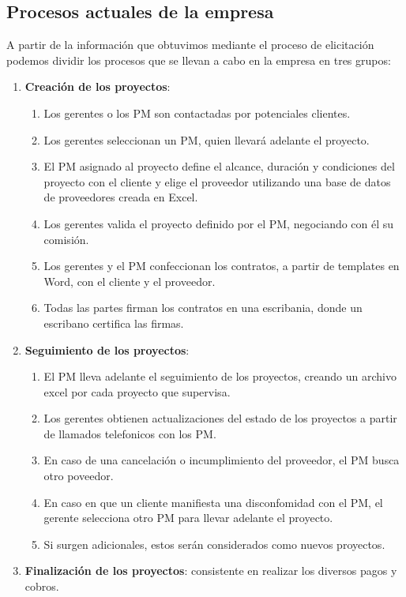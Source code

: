 \subsection{Procesos actuales de la empresa}

A partir de la información que obtuvimos mediante el proceso de elicitación podemos dividir los procesos que se llevan a cabo en la empresa en tres grupos:
\begin{enumerate}
    \item \textbf{Creación de los proyectos}:
    \begin{enumerate}
        \item Los gerentes o los PM son contactadas por potenciales clientes.
        \item Los gerentes seleccionan un PM, quien llevará adelante el proyecto.
        \item El PM asignado al proyecto define el alcance, duración y condiciones del proyecto con el cliente y elige el proveedor utilizando una base de datos de proveedores creada en Excel.
        \item Los gerentes valida el proyecto definido por el PM, negociando con él su comisión.
        \item Los gerentes y el PM confeccionan los contratos, a partir de templates en Word, con el cliente y el proveedor.
        \item Todas las partes firman los contratos en una escribania, donde un escribano certifica las firmas.
    \end{enumerate}    
    \item \textbf{Seguimiento de los proyectos}:
    \begin{enumerate}
        \item El PM lleva adelante el seguimiento de los proyectos, creando un archivo excel por cada proyecto que supervisa.   
        \item Los gerentes obtienen actualizaciones del estado de los proyectos a partir de llamados telefonicos con los PM.
        \item En caso de una cancelación o incumplimiento del proveedor, el PM busca otro poveedor.
        \item En caso en que un cliente manifiesta una disconfomidad con el PM, el gerente selecciona otro PM para llevar adelante el proyecto.
        \item Si surgen adicionales, estos serán considerados como nuevos proyectos.
    \end{enumerate}
    \item \textbf{Finalización de los proyectos}: consistente en realizar los diversos pagos y cobros.    
\end{enumerate}

